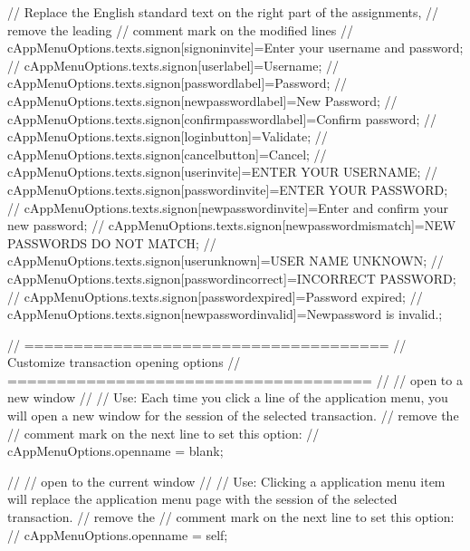 \documentclass[letterpaper,10pt,english]{sphinxmanual}
\begin{document}
\begin{sphinxVerbatim}[commandchars=\\\{\}]
// Replace the English standard text on the right part of the assignments,
// remove the leading // comment mark on the modified lines
//  cAppMenuOptions.texts.signon[\PYGZdq{}signon\PYGZhy{}invite\PYGZdq{}]=\PYGZdq{}Enter your username and password\PYGZdq{};
//  cAppMenuOptions.texts.signon[\PYGZdq{}user\PYGZhy{}label\PYGZdq{}]=\PYGZdq{}Username\PYGZdq{};
//  cAppMenuOptions.texts.signon[\PYGZdq{}password\PYGZhy{}label\PYGZdq{}]=\PYGZdq{}Password\PYGZdq{};
//  cAppMenuOptions.texts.signon[\PYGZdq{}newpassword\PYGZhy{}label\PYGZdq{}]=\PYGZdq{}New Password\PYGZdq{};
//  cAppMenuOptions.texts.signon[\PYGZdq{}confirmpassword\PYGZhy{}label\PYGZdq{}]=\PYGZdq{}Confirm password\PYGZdq{};
//  cAppMenuOptions.texts.signon[\PYGZdq{}login\PYGZhy{}button\PYGZdq{}]=\PYGZdq{}Validate\PYGZdq{};
//  cAppMenuOptions.texts.signon[\PYGZdq{}cancel\PYGZhy{}button\PYGZdq{}]=\PYGZdq{}Cancel\PYGZdq{};
//  cAppMenuOptions.texts.signon[\PYGZdq{}user\PYGZhy{}invite\PYGZdq{}]=\PYGZdq{}ENTER YOUR USERNAME\PYGZdq{};
//  cAppMenuOptions.texts.signon[\PYGZdq{}password\PYGZhy{}invite\PYGZdq{}]=\PYGZdq{}ENTER YOUR PASSWORD\PYGZdq{};
//  cAppMenuOptions.texts.signon[\PYGZdq{}newpassword\PYGZhy{}invite\PYGZdq{}]=\PYGZdq{}Enter and confirm your new password\PYGZdq{};
//  cAppMenuOptions.texts.signon[\PYGZdq{}newpassword\PYGZhy{}mismatch\PYGZdq{}]=\PYGZdq{}NEW PASSWORDS DO NOT MATCH\PYGZdq{};
//  cAppMenuOptions.texts.signon[\PYGZdq{}user\PYGZhy{}unknown\PYGZdq{}]=\PYGZdq{}USER NAME UNKNOWN\PYGZdq{};
//  cAppMenuOptions.texts.signon[\PYGZdq{}password\PYGZhy{}incorrect\PYGZdq{}]=\PYGZdq{}INCORRECT PASSWORD\PYGZdq{};
//  cAppMenuOptions.texts.signon[\PYGZdq{}password\PYGZhy{}expired\PYGZdq{}]=\PYGZdq{}Password expired\PYGZdq{};
//  cAppMenuOptions.texts.signon[\PYGZdq{}newpassword\PYGZhy{}invalid\PYGZdq{}]=\PYGZdq{}Newpassword is invalid.\PYGZdq{};



// =====================================
// Customize transaction opening options
// =====================================
//
// open to a new window
// \PYGZhy{}\PYGZhy{}\PYGZhy{}\PYGZhy{}\PYGZhy{}\PYGZhy{}\PYGZhy{}\PYGZhy{}\PYGZhy{}\PYGZhy{}\PYGZhy{}\PYGZhy{}\PYGZhy{}\PYGZhy{}\PYGZhy{}\PYGZhy{}\PYGZhy{}\PYGZhy{}\PYGZhy{}\PYGZhy{}
// Use: Each time you click a line of the application menu, you will open a new window for the session of the selected transaction.
// remove the // comment mark on the next line to set this option:
// cAppMenuOptions.open\PYGZus{}name = \PYGZdq{}\PYGZus{}blank\PYGZdq{};

//
// open to the current window
// \PYGZhy{}\PYGZhy{}\PYGZhy{}\PYGZhy{}\PYGZhy{}\PYGZhy{}\PYGZhy{}\PYGZhy{}\PYGZhy{}\PYGZhy{}\PYGZhy{}\PYGZhy{}\PYGZhy{}\PYGZhy{}\PYGZhy{}\PYGZhy{}\PYGZhy{}\PYGZhy{}\PYGZhy{}\PYGZhy{}\PYGZhy{}\PYGZhy{}\PYGZhy{}\PYGZhy{}\PYGZhy{}\PYGZhy{}
// Use: Clicking a application menu item will replace the application menu page with the session of the selected transaction.
// remove the // comment mark on the next line to set this option:
// cAppMenuOptions.open\PYGZus{}name = \PYGZdq{}\PYGZus{}self\PYGZdq{};


\end{sphinxVerbatim}
\end{document}
